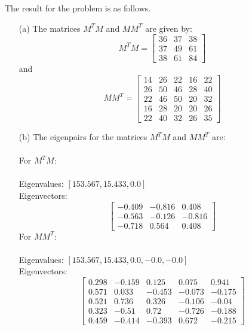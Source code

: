 \documentclass{article}
\begin{document}
The result for the problem is as follows.
\begin{enumerate}
    \item[(a)] The matrices \( M^T M \) and \( M M^T \) are given by:\\
    \[
    M^T M = \begin{bmatrix}
        36 & 37 & 38 \\
        37 & 49 & 61 \\
        38 & 61 & 84
    \end{bmatrix}
    \]
    and
    \[
    M M^T = \begin{bmatrix}
        14 & 26 & 22 & 16 & 22 \\
        26 & 50 & 46 & 28 & 40 \\
        22 & 46 & 50 & 20 & 32 \\
        16 & 28 & 20 & 20 & 26 \\
        22 & 40 & 32 & 26 & 35
    \end{bmatrix}
    \]

    \item[(b)] The eigenpairs for the matrices \( M^T M \) and \( M M^T \) are:\\
    \\
    For \( M^T M \):\\
    \\
    Eigenvalues: \( [153.567,  15.433,   0.0] \)\\
    Eigenvectors:
    \[
    \begin{bmatrix}
        -0.409 & -0.816 & 0.408 \\
        -0.563 & -0.126 & -0.816 \\
        -0.718 & 0.564  & 0.408
    \end{bmatrix}
    \]
    For \( M M^T \):\\
    \\
    Eigenvalues: \( [153.567,  15.433,   0.0,   -0.0,   -0.0] \)\\
    Eigenvectors:
    \[
    \begin{bmatrix}
     0.298 & -0.159 & 0.125 & 0.075 & 0.941 \\
    0.571 & 0.033 & -0.453 & -0.073 & -0.175 \\
    0.521 & 0.736 & 0.326 & -0.106 & -0.04 \\
    0.323 & -0.51 & 0.72  & -0.726 & -0.188 \\
    0.459 & -0.414 & -0.393 & 0.672 & -0.215
    \end{bmatrix}
    \]


\end{enumerate}
\end{document}
